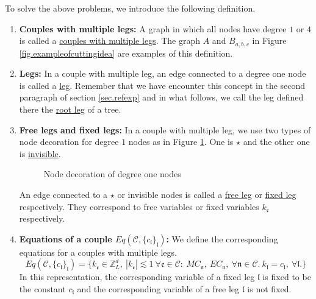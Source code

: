 To solve the above problems, we introduce the following definition.

\begin{defn}\label{def.couplemultileg}
\begin{enumerate}
    \item \textbf{Couples with multiple legs:} A graph in which all nodes have degree $1$ or $4$ is called a \underline{couples with multiple legs}. The graph $A$ and $B_{a,b,c}$ in Figure \ref{fig.exampleofcuttingidea} are examples of this definition.
    \item \textbf{Legs:} In a couple with multiple leg, an edge connected to a degree one node is called a \underline{leg}. Remember that we have encounter this concept in the second paragraph of section \ref{sec.refexp} and in what follows, we call the leg defined there the \underline{root leg} of a tree.   
    \item \textbf{Free legs and fixed legs:} In a couple with multiple leg, we use two types of node decoration for degree $1$ nodes as in Figure \ref{fig.decorationdegreeone}. One is $\star$ and the other one is \underline{invisible}. 
    \begin{figure}[H]
    \centering
        \caption{Node decoration of degree one nodes}
        \label{fig.decorationdegreeone}
    \end{figure}
    An edge connected to a $\star$ or invisible nodes is called a \underline{free leg} or \underline{fixed leg} respectively. They correspond to free variables or fixed variables $k_{\mathfrak{e}}$ respectively.
    
    
    \item \textbf{Equations of a couple $Eq(\mathcal{C},\{c_{\mathfrak{l}}\}_{\mathfrak{l}})$:} We define the corresponding equations for a couples with multiple legs.
    \begin{equation}\label{eq.Eq(C,c)}
        Eq(\mathcal{C},\{c_{\mathfrak{l}}\}_{\mathfrak{l}})=\{k_{\mathfrak{e}}\in \mathbb{Z}^d_L,\ |k_{\mathfrak{e}}|\lesssim 1\ \forall \mathfrak{e}\in \mathcal{C}:\ MC_{\mathfrak{n}},\  EC_{\mathfrak{n}},\ \forall \mathfrak{n}\in \mathcal{C}.\ k_{\mathfrak{l}}=c_{\mathfrak{l}},\ \forall \mathfrak{l}.\}   
    \end{equation}
    In this representation, the corresponding variable of a fixed leg $\mathfrak{l}$ is fixed to be the constant $c_{\mathfrak{l}}$ and the corresponding variable of a free leg $\mathfrak{l}$ is not fixed.
\end{enumerate}
\end{defn}

